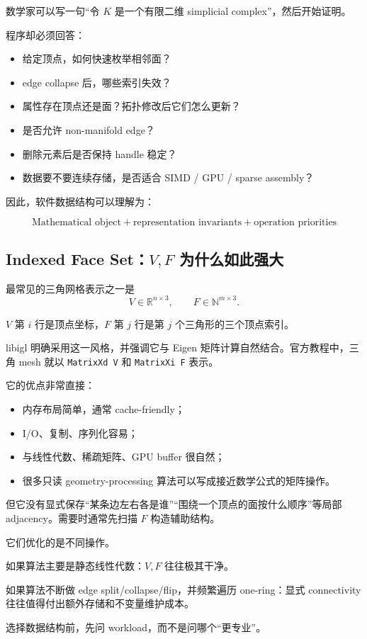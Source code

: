 \documentclass[UTF8,11pt]{ctexart}
\newcommand{\code}[1]{\texttt{#1}}
\begin{document}
数学家可以写一句“令 $K$ 是一个有限二维 simplicial complex”，然后开始证明。

程序却必须回答：

\begin{itemize}
  \item 给定顶点，如何快速枚举相邻面？
  \item edge collapse 后，哪些索引失效？
  \item 属性存在顶点还是面？拓扑修改后它们怎么更新？
  \item 是否允许 non-manifold edge？
  \item 删除元素后是否保持 handle 稳定？
  \item 数据要不要连续存储，是否适合 SIMD / GPU / sparse assembly？
\end{itemize}

因此，软件数据结构可以理解为：

\[
\boxed{\text{Mathematical object} + \text{representation invariants} + \text{operation priorities}}
\]

\subsection{Indexed Face Set：$V,F$ 为什么如此强大}

最常见的三角网格表示之一是
\[
V\in\mathbb R^{n\times 3},\qquad
F\in\mathbb N^{m\times 3}.
\]

$V$ 第 $i$ 行是顶点坐标，$F$ 第 $j$ 行是第 $j$ 个三角形的三个顶点索引。

libigl 明确采用这一风格，并强调它与 Eigen 矩阵计算自然结合。官方教程中，三角 mesh 就以 \code{MatrixXd V} 和 \code{MatrixXi F} 表示。

它的优点非常直接：

\begin{itemize}
  \item 内存布局简单，通常 cache-friendly；
  \item I/O、复制、序列化容易；
  \item 与线性代数、稀疏矩阵、GPU buffer 很自然；
  \item 很多只读 geometry-processing 算法可以写成接近数学公式的矩阵操作。
\end{itemize}

但它没有显式保存“某条边左右各是谁”“围绕一个顶点的面按什么顺序”等局部 adjacency。需要时通常先扫描 $F$ 构造辅助结构。

\begin{keyidea}
它们优化的是不同操作。

如果算法主要是静态线性代数：$V,F$ 往往极其干净。

如果算法不断做 edge split/collapse/flip，并频繁遍历 one-ring：显式 connectivity 往往值得付出额外存储和不变量维护成本。

选择数据结构前，先问 workload，而不是问哪个“更专业”。
\end{keyidea}
\end{document}
